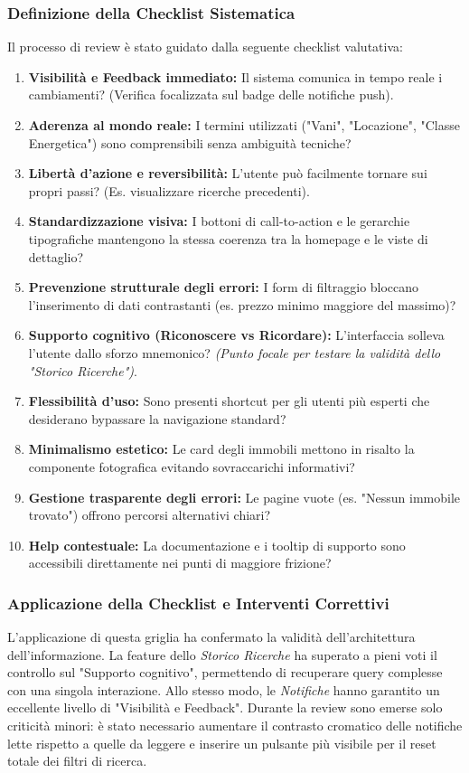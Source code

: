 \documentclass{article}
\begin{document}
\subsubsection{Definizione della Checklist Sistematica}
Il processo di review è stato guidato dalla seguente checklist valutativa:
\begin{enumerate}
    \item \textbf{Visibilità e Feedback immediato:} Il sistema comunica in tempo reale i cambiamenti? (Verifica focalizzata sul badge delle notifiche push).
    \item \textbf{Aderenza al mondo reale:} I termini utilizzati ("Vani", "Locazione", "Classe Energetica") sono comprensibili senza ambiguità tecniche?
    \item \textbf{Libertà d'azione e reversibilità:} L'utente può facilmente tornare sui propri passi? (Es. visualizzare ricerche precedenti).
    \item \textbf{Standardizzazione visiva:} I bottoni di call-to-action e le gerarchie tipografiche mantengono la stessa coerenza tra la homepage e le viste di dettaglio?
    \item \textbf{Prevenzione strutturale degli errori:} I form di filtraggio bloccano l'inserimento di dati contrastanti (es. prezzo minimo maggiore del massimo)?
    \item \textbf{Supporto cognitivo (Riconoscere vs Ricordare):} L'interfaccia solleva l'utente dallo sforzo mnemonico? \textit{(Punto focale per testare la validità dello "Storico Ricerche")}.
    \item \textbf{Flessibilità d'uso:} Sono presenti shortcut per gli utenti più esperti che desiderano bypassare la navigazione standard?
    \item \textbf{Minimalismo estetico:} Le card degli immobili mettono in risalto la componente fotografica evitando sovraccarichi informativi?
    \item \textbf{Gestione trasparente degli errori:} Le pagine vuote (es. "Nessun immobile trovato") offrono percorsi alternativi chiari?
    \item \textbf{Help contestuale:} La documentazione e i tooltip di supporto sono accessibili direttamente nei punti di maggiore frizione?
\end{enumerate}

\subsubsection{Applicazione della Checklist e Interventi Correttivi}
L'applicazione di questa griglia ha confermato la validità dell'architettura dell'informazione. La feature dello \textit{Storico Ricerche} ha superato a pieni voti il controllo sul "Supporto cognitivo", permettendo di recuperare query complesse con una singola interazione. Allo stesso modo, le \textit{Notifiche} hanno garantito un eccellente livello di "Visibilità e Feedback".
Durante la review sono emerse solo criticità minori: è stato necessario aumentare il contrasto cromatico delle notifiche lette rispetto a quelle da leggere e inserire un pulsante più visibile per il reset totale dei filtri di ricerca.
\end{document}
